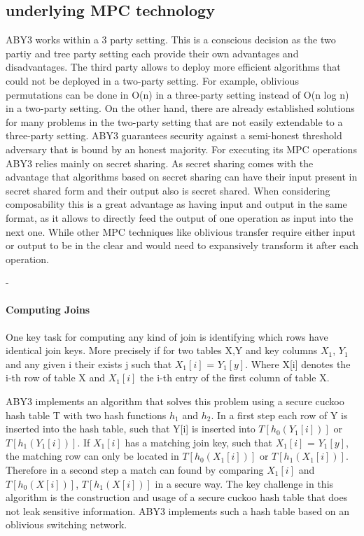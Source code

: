 \subsection{underlying MPC technology}
ABY3 works within a 3 party setting. This is a conscious decision as the two partiy and tree party setting each provide their own advantages and disadvantages.
The third party allows to deploy more efficient algorithms that could not be deployed in a two-party setting. For example, oblivious permutations can be done in O(n) in a three-party setting instead of O(n log n) in a two-party setting. On the other hand, there are already established solutions for many problems in the two-party setting that are not easily extendable to a three-party setting. ABY3 guarantees security against a semi-honest threshold adversary that is bound by an honest majority. For executing its MPC operations ABY3 relies mainly on secret sharing. As secret sharing comes with the advantage that algorithms based on secret sharing can have their input present in secret shared form and their output also is secret shared. When considering composability this is a great advantage as having input and output in the same format, as it allows to directly feed the output of one operation as input into the next one. While other MPC techniques like oblivious transfer require either input or output to be in the clear and would need to expansively transform it after each operation. 

-%





\paragraph{Computing Joins}
One key task for computing any kind of join is identifying which rows have identical join keys. More precisely if for two tables X,Y and key columns $X_1$, $Y_1$ and any given i  their exists j such that $X_1[i]$ = $Y_1[y]$. Where X[i] denotes the i-th row of table X and $ X_1[i] $ the i-th entry of the first column of table X. 

ABY3 implements an algorithm that solves this problem using a secure cuckoo hash table T with two hash functions $ h_1 $ and $h_2$. 
In a first step each row of Y is inserted into the hash table, such that Y[i] is inserted into $ T[h_0(Y_1 [i]  )] $ or $T[h_1(Y_1 [i]  )] $. 
If $X_1[i]$ has a matching join key, such that  $X_1[i]$ = $Y_1[y]$,  the matching row can only be located in $ T[h_0(X_1[i])] $ or  $T[h_1( X_1[i])] $. 
Therefore in a second step a match can found by comparing $X_1[i]$ and $ T[h_0(X[i])] $,  $T[h_1(X[i])] $ in a secure way. The key challenge in this algorithm is the construction and usage of a secure cuckoo hash table that does not leak sensitive information. ABY3 implements such a hash table based on an oblivious switching network.
